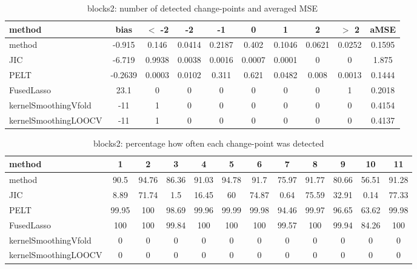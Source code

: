\begin{table}[ht]
\centering
\begin{tabular}{l|c|ccccccc|c}
  \hline
method & bias & $<$ -2 & -2 & -1 & 0 & 1 & 2 & $>$ 2 & aMSE \\ 
  \hline
method & -0.915 & 0.146 & 0.0414 & 0.2187 & 0.402 & 0.1046 & 0.0621 & 0.0252 & 0.1595 \\ 
  JIC & -6.719 & 0.9938 & 0.0038 & 0.0016 & 0.0007 & 0.0001 &     0 &     0 & 1.875 \\ 
  PELT & -0.2639 & 0.0003 & 0.0102 & 0.311 & 0.621 & 0.0482 & 0.008 & 0.0013 & 0.1444 \\ 
  FusedLasso &  23.1 &     0 &     0 &     0 &     0 &     0 &     0 &     1 & 0.2018 \\ 
  kernelSmoothingVfold &   -11 &     1 &     0 &     0 &     0 &     0 &     0 &     0 & 0.4154 \\ 
  kernelSmoothingLOOCV &   -11 &     1 &     0 &     0 &     0 &     0 &     0 &     0 & 0.4137 \\ 
   \hline
\end{tabular}
\caption{blocks2: number of detected change-points and averaged MSE} 
\label{tab:blocks2Njumps}
\end{table}
\begin{table}[ht]
\centering
\begin{tabular}{l|ccccccccccc}
  \hline
method & 1 & 2 & 3 & 4 & 5 & 6 & 7 & 8 & 9 & 10 & 11 \\ 
  \hline
method &   90.5 &  94.76 &  86.36 &  91.03 &  94.78 &   91.7 &  75.97 &  91.77 &  80.66 &  56.51 &  91.28 \\ 
  JIC &   8.89 &  71.74 &    1.5 &  16.45 &     60 &  74.87 &   0.64 &  75.59 &  32.91 &   0.14 &  77.33 \\ 
  PELT &  99.95 &    100 &  98.69 &  99.96 &  99.99 &  99.98 &  94.46 &  99.97 &  96.65 &  63.62 &  99.98 \\ 
  FusedLasso &    100 &    100 &  99.84 &    100 &    100 &    100 &  99.57 &    100 &  99.94 &  84.26 &    100 \\ 
  kernelSmoothingVfold &      0 &      0 &      0 &      0 &      0 &      0 &      0 &      0 &      0 &      0 &      0 \\ 
  kernelSmoothingLOOCV &      0 &      0 &      0 &      0 &      0 &      0 &      0 &      0 &      0 &      0 &      0 \\ 
   \hline
\end{tabular}
\caption{blocks2: percentage how often each change-point was detected} 
\label{tab:blocks2Detections}
\end{table}
